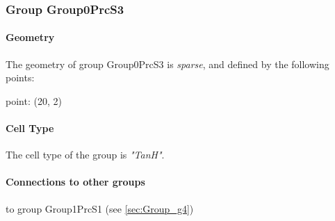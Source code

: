 \documentclass[a4paper, 11pt]{article}
\begin{document}
\subsubsection{Group Group0PrcS3}
\label{sec:Group_g8}

\paragraph*{Geometry}

The geometry of group Group0PrcS3 is \emph{sparse}, and defined
by the following points:
\begin{compactitem}
   \item point: (20, 2)
\end{compactitem}

\paragraph*{Cell Type}
The cell type of the group is \emph{"TanH"}.
\paragraph*{Connections to other groups}
\begin{compactenum}
\item to group Group1PrcS1 (see \ref{sec:Group_g4})
\end{compactenum}
\end{document}
